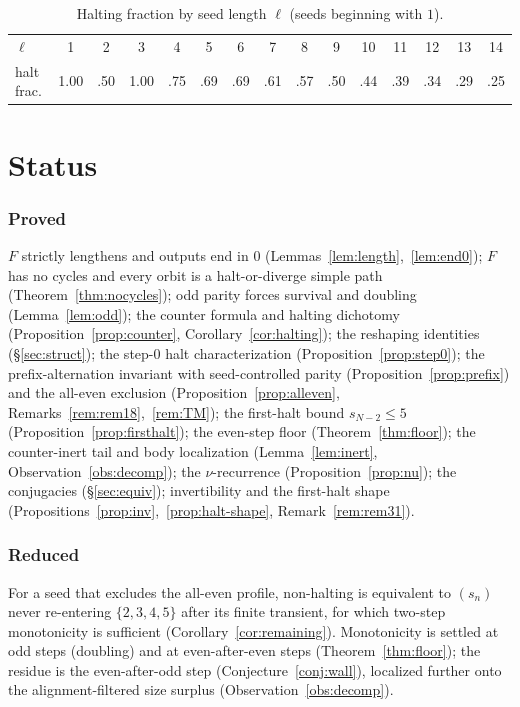 \documentclass[11pt,reqno]{amsart}
\theoremstyle{plain}
\theoremstyle{definition}
\theoremstyle{remark}
\begin{document}
\begin{table}[h]\centering
\begin{tabular}{l|cccccccccccccc}
$\ell$ & 1 & 2 & 3 & 4 & 5 & 6 & 7 & 8 & 9 & 10 & 11 & 12 & 13 & 14\\
halt frac. & 1.00 & .50 & 1.00 & .75 & .69 & .69 & .61 & .57 & .50 & .44 & .39 & .34 & .29 & .25
\end{tabular}
\caption{Halting fraction by seed length $\ell$ (seeds beginning with $1$).}
\label{tab:bylength}
\end{table}

\section{Status}\label{sec:status}
\subsubsection*{Proved} $F$ strictly lengthens and outputs end in $0$ (Lemmas~\ref{lem:length},~\ref{lem:end0}); $F$ has no cycles and every orbit is a halt-or-diverge simple path (Theorem~\ref{thm:nocycles}); odd parity forces survival and doubling (Lemma~\ref{lem:odd}); the counter formula and halting dichotomy (Proposition~\ref{prop:counter}, Corollary~\ref{cor:halting}); the reshaping identities (\S\ref{sec:struct}); the step-$0$ halt characterization (Proposition~\ref{prop:step0}); the prefix-alternation invariant with seed-controlled parity (Proposition~\ref{prop:prefix}) and the all-even exclusion (Proposition~\ref{prop:alleven}, Remarks~\ref{rem:rem18},~\ref{rem:TM}); the first-halt bound $s_{N-2}\le 5$ (Proposition~\ref{prop:firsthalt}); the even-step floor (Theorem~\ref{thm:floor}); the counter-inert tail and body localization (Lemma~\ref{lem:inert}, Observation~\ref{obs:decomp}); the $\nu$-recurrence (Proposition~\ref{prop:nu}); the conjugacies (\S\ref{sec:equiv}); invertibility and the first-halt shape (Propositions~\ref{prop:inv},~\ref{prop:halt-shape}, Remark~\ref{rem:rem31}).

\subsubsection*{Reduced} For a seed that excludes the all-even profile, non-halting is equivalent to $(s_n)$ never re-entering $\{2,3,4,5\}$ after its finite transient, for which two-step monotonicity is sufficient (Corollary~\ref{cor:remaining}). Monotonicity is settled at odd steps (doubling) and at even-after-even steps (Theorem~\ref{thm:floor}); the residue is the even-after-odd step (Conjecture~\ref{conj:wall}), localized further onto the alignment-filtered size surplus (Observation~\ref{obs:decomp}).
\end{document}
